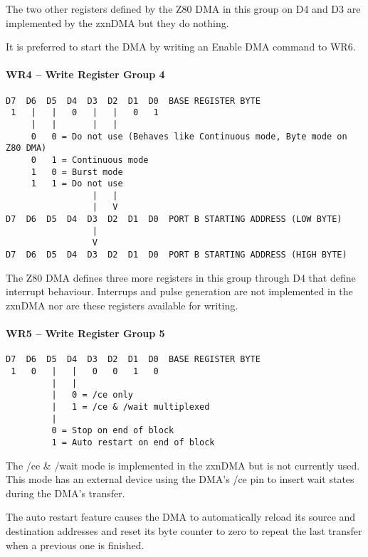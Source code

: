 The two other registers defined by the Z80 DMA in this group on D4 and
D3 are implemented by the zxnDMA but they do nothing.

It is preferred to start the DMA by writing an Enable DMA command to
WR6.

\paragraph{WR4 – Write Register Group 4}
\begin{verbatim}
D7  D6  D5  D4  D3  D2  D1  D0  BASE REGISTER BYTE
 1   |   |   0   |   |   0   1
     |   |       |   |
     0   0 = Do not use (Behaves like Continuous mode, Byte mode on Z80 DMA)
     0   1 = Continuous mode
     1   0 = Burst mode
     1   1 = Do not use
                 |   |
                 |   V
D7  D6  D5  D4  D3  D2  D1  D0  PORT B STARTING ADDRESS (LOW BYTE)
                 |
                 V
D7  D6  D5  D4  D3  D2  D1  D0  PORT B STARTING ADDRESS (HIGH BYTE)
\end{verbatim}
The Z80 DMA defines three more registers in this group through D4 that
define interrupt behaviour. Interrups and pulse generation are not
implemented in the zxnDMA nor are these registers available for
writing.

\paragraph{WR5 – Write Register Group 5}
\begin{verbatim}
D7  D6  D5  D4  D3  D2  D1  D0  BASE REGISTER BYTE
 1   0   |   |   0   0   1   0
         |   |
         |   0 = /ce only
         |   1 = /ce & /wait multiplexed
         |
         0 = Stop on end of block
         1 = Auto restart on end of block
\end{verbatim}
The /ce \& /wait mode is implemented in the zxnDMA but is not currently
used. This mode has an external device using the DMA's /ce pin to
insert wait states during the DMA's transfer.

The auto restart feature causes the DMA to automatically reload its
source and destination addresses and reset its byte counter to zero to
repeat the last transfer when a previous one is finished.

